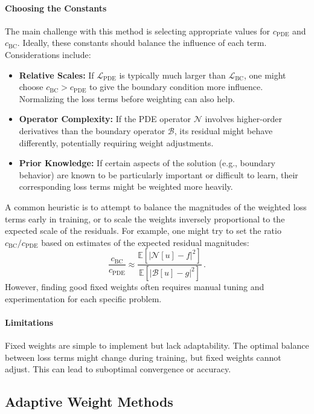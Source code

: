 \paragraph{Choosing the Constants}
The main challenge with this method is selecting appropriate values for $c_{\text{PDE}}$ and $c_{\text{BC}}$. Ideally, these constants should balance the influence of each term. Considerations include:
\begin{itemize} 
    \item \textbf{Relative Scales:} If $\mathcal{L}_{\text{PDE}}$ is typically much larger than $\mathcal{L}_{\text{BC}}$, one might choose $c_{\text{BC}} > c_{\text{PDE}}$ to give the boundary condition more influence. Normalizing the loss terms before weighting can also help.
    \item \textbf{Operator Complexity:} If the PDE operator $\mathcal{N}$ involves higher-order derivatives than the boundary operator $\mathcal{B}$, its residual might behave differently, potentially requiring weight adjustments.
    \item \textbf{Prior Knowledge:} If certain aspects of the solution (e.g., boundary behavior) are known to be particularly important or difficult to learn, their corresponding loss terms might be weighted more heavily.
\end{itemize}
A common heuristic is to attempt to balance the magnitudes of the weighted loss terms early in training, or to scale the weights inversely proportional to the expected scale of the residuals. For example, one might try to set the ratio $c_{\text{BC}}/c_{\text{PDE}}$ based on estimates of the expected residual magnitudes:
%
\begin{equation*} 
\frac{c_{\text{BC}}}{c_{\text{PDE}}} \approx \frac{\mathbb{E}\left[ |\mathcal{N}[u] - f|^2 \right]}{\mathbb{E}\left[ |\mathcal{B}[u] - g|^2 \right]}\,. 
\end{equation*}
%
However, finding good fixed weights often requires manual tuning and experimentation for each specific problem.

\paragraph{Limitations}
Fixed weights are simple to implement but lack adaptability. The optimal balance between loss terms might change during training, but fixed weights cannot adjust. This can lead to suboptimal convergence or accuracy.

\subsection{Adaptive Weight Methods}
\label{subsec:adaptive_weights}


